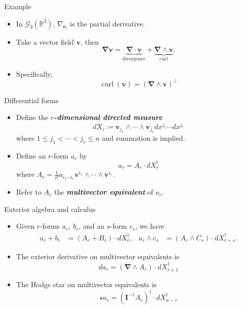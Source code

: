 \documentclass[aspectratio=169]{beamer}
\newcommand\boldgreen[1]{\textcolor{lighter_csu_green}{\emph{\textbf{#1}}}}
\newcommand{\R}{\mathbb{R}}
\newcommand{\grad}{\boldsymbol{\nabla}}
\newcommand{\G}{\mathcal{G}}
\newcommand{\blade}[1]{\boldsymbol{#1}}
\newcommand{\pseudoscalar}{\blade{I}}
\begin{document}
\begin{frame}{Example}
\vfill
\begin{itemize}
\pause
\item In $\G_3(\R^3)$, $\nabla_{\blade{e}_i}$ is the partial derivative.
\pause
\item Take a vector field $\blade{v}$, then
    \[
    \grad \blade{v} = \underbrace{\grad \cdot \blade{v}}_{\textrm{divergence}} + \underbrace{\grad \wedge \blade{v}}_{\textrm{curl}}.
    \]
\pause
\item Specifically,
\[
    \operatorname{curl}(\blade{v}) = (\grad \wedge \blade{v})^\perp
\]
\end{itemize}
\vfill
\end{frame}

\begin{frame}{Differential forms}
\vfill
\begin{itemize}
    \pause
    \item Define the \boldgreen{$r$-dimensional directed measure}
    \[
    dX_r\coloneqq \blade{v}_{j_1} \wedge \cdots \wedge \blade{v}_{j_r} dx^{j_1} \cdots dx^{j_r}
    \] 
    where $1\leq j_1<\cdots<j_r\leq n$ and summation is implied. 
    \pause
    \item Define an $r$-form $a_r$ by
    \[
    a_r = A_r \cdot dX_r^\dagger
    \]
    where $A_r = \frac{1}{r!} a_{i_1 \cdots i_r} \blade{v}^{i_1} \wedge \cdots \wedge \blade{v}^{i_r}$. 
    \pause
    \item Refer to $A_r$ the \boldgreen{multivector equivalent} of $a_r$.
\end{itemize}
\vfill
\end{frame}

\begin{frame}{Exterior algebra and calculus}
\vfill
\begin{itemize}
\pause
\item Given $r$-forms $a_r$, $b_r$, and an $s$-form $c_s$, we have
\begin{align*}
a_r + b_r &= (A_r+B_r) \cdot dX_r^\dagger, & a_r \wedge c_s &= (A_r \wedge C_s) \cdot dX_{r+s}^\dagger.
\end{align*}
\vspace*{-0.25cm}
\pause
\item The exterior derivative on multivector equivalents is 
\[
da_r = (\grad \wedge A_r) \cdot dX_{r+1}^\dagger
\]
\pause
\vspace*{-0.25cm}
\item The Hodge star on multivector equivalents is
\[
\star a_r = (\pseudoscalar^{-1} A_r)^\dagger \cdot dX_{n-r}^\dagger
\]
\end{itemize}
\vfill
\end{frame}
\end{document}
